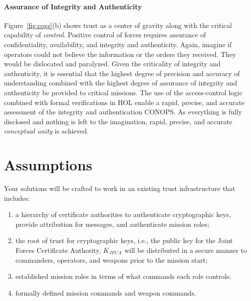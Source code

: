 \documentclass[10pt,twoside]{article}
\begin{document}
\paragraph{Assurance of Integrity and Authenticity}

Figure~\ref{fig:cogs}(b) shows trust as a center of gravity along with
the critical capability of \emph{control}. Positive control of forces
requires assurance of confidentiality, availability, and integrity and
authenticity. Again, imagine if operators could not believe the
information or the orders they received. They would be dislocated and
paralyzed. Given the criticality of integrity and authenticity, it is
essential that the highest degree of precision and accuracy of
understanding combined with the highest degree of assurance of
integrity and authenticity be provided to critical missions.  The use
of the access-control logic combined with formal verifications in HOL
enable a rapid, precise, and accurate assessment of the integrity and
authentication CONOPS. As everything is fully disclosed and nothing is
left to the imagination, rapid, precise, and accurate \emph{conceptual
  unity} is achieved.

\section{Assumptions}
\label{sec:assumptions}

Your solutions will be crafted to work in an existing trust
infrastructure that includes:
\begin{enumerate}
\item a hierarchy of certificate authorities to authenticate
  cryptographic keys, provide attribution for messages, and
  authenticate mission roles;
\item the root of trust for cryptographic keys, i.e., the public key
  for the Joint Forces Certificate Authority, $K_{JFCA}$ will be
  distributed in a secure manner to commanders, operators, and weapons
  prior to the mission start;
\item established mission roles in terms of what commands each role
  controls;
\item formally defined mission commands and weapon commands.
\end{enumerate}
\end{document}
